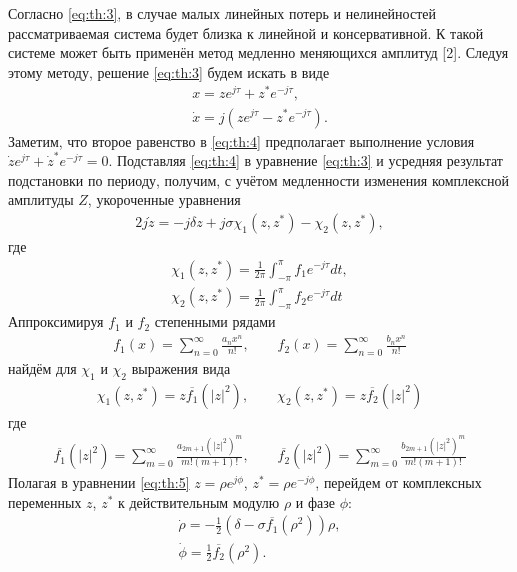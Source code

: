 Согласно \cref{eq:th:3}, в случае малых линейных потерь и нелинейностей рассматриваемая система будет близка к линейной и консервативной. К такой системе может быть применён метод медленно меняющихся амплитуд [2]. Следуя этому методу, решение \cref{eq:th:3} будем искать в виде
\begin{align} \label{eq:th:4}
	x = z e^{j\tau} + z^* e^{-j\tau}, \nonumber \\
	\dot{x} = j\left(z e^{j\tau} - z^* e^{-j\tau}\right).
\end{align}
Заметим, что второе равенство в \cref{eq:th:4} предполагает выполнение условия $\dot{z}e^{j\tau} + \dot{z}^*e^{-j\tau} = 0$. Подставляя \cref{eq:th:4} в уравнение \cref{eq:th:3} и усредняя результат подстановки по периоду, получим, с учётом медленности изменения комплексной амплитуды $Z$, укороченные уравнения
\begin{align} \label{eq:th:5}
	2j\dot{z} = -j\delta z + j\sigma\chi_1(z, z^*) - \chi_2(z, z^*),
\end{align}
где
\begin{align} \label{eq:th:6}
	\chi_1(z, z^*) = \frac{1}{2\pi}\int_{-\pi}^{\pi} f_1 e^{-j\tau}dt, \nonumber \\
	\chi_2(z, z^*) = \frac{1}{2\pi}\int_{-\pi}^{\pi} f_2 e^{-j\tau}dt
\end{align}
Аппроксимируя $f_1$ и $f_2$ степенными рядами
\begin{align} \label{eq:th:7}
	f_1(x) = \sum_{n=0}^{\infty}\frac{a_n x^n}{n!}, \qquad f_2(x) = \sum_{n=0}^{\infty}\frac{b_n x^n}{n!}
\end{align}
найдём для $\chi_1$ и $\chi_2$ выражения вида
\begin{align} \label{eq:th:8}
	\chi_1(z, z^*) = z\overline{f_1}(|z|^2), \qquad \chi_2(z, z^*) = z\overline{f_2}(|z|^2)
\end{align}
где
\begin{align} \label{eq:th:9}
	\overline{f_1}(|z|^2) = \sum_{m=0}^{\infty}\frac{a_{2m+1}(|z|^2)^m}{m!(m+1)!}, \qquad \overline{f_2}(|z|^2) = \sum_{m=0}^{\infty}\frac{b_{2m+1}(|z|^2)^m}{m!(m+1)!}
\end{align}
Полагая в уравнении \cref{eq:th:5} $z = \rho e^{j\phi}$, $z^* = \rho e^{-j\phi}$, перейдем от комплексных переменных $z$, $z^*$ к действительным модулю $\rho$ и фазе $\phi$:
\begin{align} \label{eq:th:10}
	\dot{\rho} = -\frac{1}{2}\left(\delta - \sigma\overline{f_1}(\rho^2)\right)\rho, \nonumber \\
	\dot{\phi} = \frac{1}{2}\overline{f_2}(\rho^2).
\end{align}
